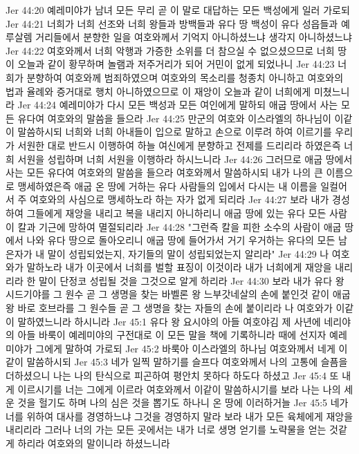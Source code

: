 Jer 44:20  예레미야가 남녀 모든 무리 곧 이 말로 대답하는 모든 백성에게 일러 가로되
Jer 44:21  너희가 너희 선조와 너희 왕들과 방백들과 유다 땅 백성이 유다 성읍들과 예루살렘 거리들에서 분향한 일을 여호와께서 기억지 아니하셨느냐 생각지 아니하셨느냐
Jer 44:22  여호와께서 너희 악행과 가증한 소위를 더 참으실 수 없으셨으므로 너희 땅이 오늘과 같이 황무하며 놀램과 저주거리가 되어 거민이 없게 되었나니
Jer 44:23  너희가 분향하여 여호와께 범죄하였으며 여호와의 목소리를 청종치 아니하고 여호와의 법과 율례와 증거대로 행치 아니하였으므로 이 재앙이 오늘과 같이 너희에게 미쳤느니라
Jer 44:24  예레미야가 다시 모든 백성과 모든 여인에게 말하되 애굽 땅에서 사는 모든 유다여 여호와의 말씀을 들으라
Jer 44:25  만군의 여호와 이스라엘의 하나님이 이같이 말씀하시되 너희와 너희 아내들이 입으로 말하고 손으로 이루려 하여 이르기를 우리가 서원한 대로 반드시 이행하여 하늘 여신에게 분향하고 전제를 드리리라 하였은즉 너희 서원을 성립하며 너희 서원을 이행하라 하시느니라
Jer 44:26  그러므로 애굽 땅에서 사는 모든 유다여 여호와의 말씀을 들으라 여호와께서 말씀하시되 내가 나의 큰 이름으로 맹세하였은즉 애굽 온 땅에 거하는 유다 사람들의 입에서 다시는 내 이름을 일컬어서 주 여호와의 사심으로 맹세하노라 하는 자가 없게 되리라
Jer 44:27  보라 내가 경성하여 그들에게 재앙을 내리고 복을 내리지 아니하리니 애굽 땅에 있는 유다 모든 사람이 칼과 기근에 망하여 멸절되리라
Jer 44:28  "그런즉 칼을 피한 소수의 사람이 애굽 땅에서 나와 유다 땅으로 돌아오리니 애굽 땅에 들어가서 거기 우거하는 유다의 모든 남은자가 내 말이 성립되었는지, 자기들의 말이 성립되었는지 알리라"
Jer 44:29  나 여호와가 말하노라 내가 이곳에서 너희를 벌할 표징이 이것이라 내가 너희에게 재앙을 내리리라 한 말이 단정코 성립될 것을 그것으로 알게 하리라
Jer 44:30  보라 내가 유다 왕 시드기야를 그 원수 곧 그 생명을 찾는 바벨론 왕 느부갓네살의 손에 붙인것 같이 애굽 왕 바로 호브라를 그 원수들 곧 그 생명을 찾는 자들의 손에 붙이리라 나 여호와가 이같이 말하였느니라 하시니라
Jer 45:1  유다 왕 요시야의 아들 여호야김 제 사년에 네리야의 아들 바룩이 예레미야의 구전대로 이 모든 말을 책에 기록하니라 때에 선지자 예레미야가 그에게 말하여 가로되
Jer 45:2  바룩아 이스라엘의 하나님 여호와께서 네게 이같이 말씀하시되
Jer 45:3  네가 일찍 말하기를 슬프다 여호와께서 나의 고통에 슬픔을 더하셨으니 나는 나의 탄식으로 피곤하여 평안치 못하다 하도다 하셨고
Jer 45:4  또 내게 이르시기를 너는 그에게 이르라 여호와께서 이같이 말씀하시기를 보라 나는 나의 세운 것을 헐기도 하며 나의 심은 것을 뽑기도 하나니 온 땅에 이러하거늘
Jer 45:5  네가 너를 위하여 대사를 경영하느냐 그것을 경영하지 말라 보라 내가 모든 육체에게 재앙을 내리리라 그러나 너의 가는 모든 곳에서는 내가 너로 생명 얻기를 노략물을 얻는 것같게 하리라 여호와의 말이니라 하셨느니라
